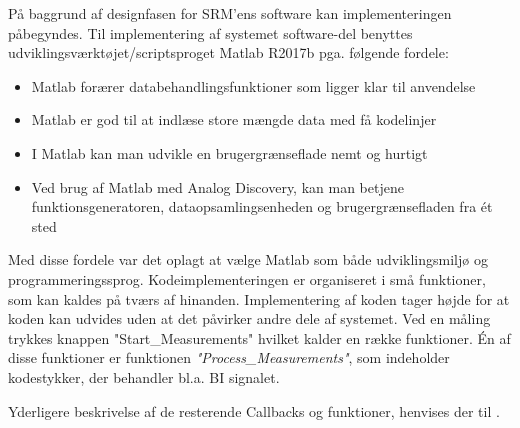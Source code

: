 På baggrund af designfasen for SRM'ens software kan implementeringen påbegyndes. Til implementering  af systemet software-del benyttes  udviklingsværktøjet/scriptsproget  Matlab R2017b pga. følgende fordele:


\begin{itemize}
\item Matlab forærer databehandlingsfunktioner som ligger klar til anvendelse
\item Matlab er god til at indlæse store mængde data med få kodelinjer
\item I Matlab kan man udvikle en brugergrænseflade nemt og hurtigt 
\item Ved brug af Matlab med Analog Discovery, kan man betjene  funktionsgeneratoren, dataopsamlingsenheden og brugergrænsefladen  fra ét sted
\end{itemize}
   
Med disse fordele var det oplagt at vælge Matlab som både udviklingsmiljø og programmeringssprog.  
Kodeimplementeringen er organiseret i små funktioner, som kan kaldes på tværs af hinanden. Implementering af koden tager højde for at koden kan udvides uden at det påvirker andre dele af systemet. Ved en måling trykkes knappen "Start\_Measurements" hvilket kalder en række funktioner. Én af disse funktioner er funktionen \textit{"Process\_Measurements"}, som indeholder kodestykker, der behandler bl.a. BI signalet.

%





Yderligere beskrivelse af de resterende Callbacks og funktioner, henvises der til . 
